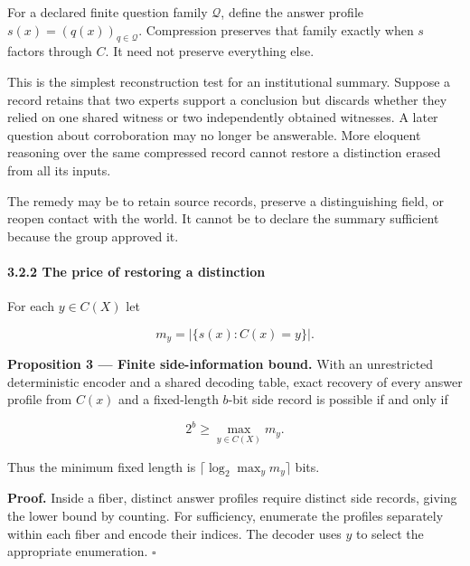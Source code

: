 \documentclass[
  10pt,
]{article}
\begin{document}
For a declared finite question family \protect\hypertarget{math-E0031-0039}{}{\(\mathcal Q\)}, define the answer profile \protect\hypertarget{math-E0032-0040}{}{\(s(x)=(q(x))_{q\in\mathcal Q}\)}. Compression preserves that family exactly when \protect\hypertarget{math-E0033-0041}{}{\(s\)} factors through \protect\hypertarget{math-E0026-0042}{}{\(C\)}. It need not preserve everything else.

This is the simplest reconstruction test for an institutional summary. Suppose a record retains that two experts support a conclusion but discards whether they relied on one shared witness or two independently obtained witnesses. A later question about corroboration may no longer be answerable. More eloquent reasoning over the same compressed record cannot restore a distinction erased from all its inputs.

The remedy may be to retain source records, preserve a distinguishing field, or reopen contact with the world. It cannot be to declare the summary sufficient because the group approved it.

\paragraph{3.2.2 The price of restoring a distinction}\label{the-price-of-restoring-a-distinction}

For each \protect\hypertarget{math-E0034-0043}{}{\(y\in C(X)\)} let

\protect\hypertarget{math-E0035-0044}{}{\[
m_y=\left|\{s(x):C(x)=y\}\right|.
\]}

\textbf{Proposition 3 --- Finite side-information bound.} With an unrestricted deterministic encoder and a shared decoding table, exact recovery of every answer profile from \protect\hypertarget{math-E0036-0045}{}{\(C(x)\)} and a fixed-length \protect\hypertarget{math-E0003-0046}{}{\(b\)}-bit side record is possible if and only if

\protect\hypertarget{math-E0037-0047}{}{\[
2^b\geq\max_{y\in C(X)}m_y.
\]}

Thus the minimum fixed length is \protect\hypertarget{math-E0038-0048}{}{\(\lceil\log_2\max_y m_y\rceil\)} bits.

\textbf{Proof.} Inside a fiber, distinct answer profiles require distinct side records, giving the lower bound by counting. For sufficiency, enumerate the profiles separately within each fiber and encode their indices. The decoder uses \protect\hypertarget{math-E0039-0049}{}{\(y\)} to select the appropriate enumeration. \protect\hypertarget{math-E0019-0050}{}{\(\square\)}
\end{document}
